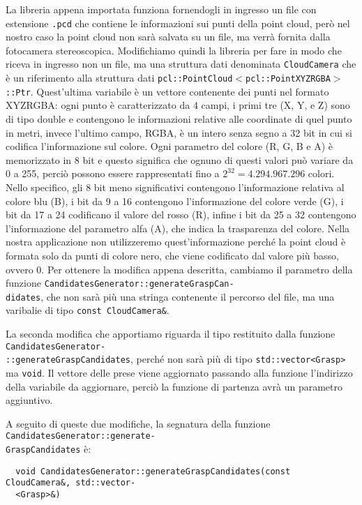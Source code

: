 \documentclass{report}
\begin{document}
La libreria appena importata funziona fornendogli in ingresso un file con estensione \texttt{.pcd} che contiene le informazioni sui punti della point cloud, però nel nostro caso la point cloud non sarà salvata su un file, ma verrà fornita dalla fotocamera stereoscopica. Modifichiamo quindi la libreria per fare in modo che riceva in ingresso non un file, ma una struttura dati denominata \texttt{CloudCamera} che è un riferimento alla struttura dati \texttt{pcl::PointCloud$<$pcl::PointXYZRGBA$>$::Ptr}. Quest'ultima variabile è un vettore contenente dei punti nel formato XYZRGBA: ogni punto è caratterizzato da 4 campi, i primi tre (X, Y, e Z) sono di tipo double e contengono le informazioni relative alle coordinate di quel punto in metri, invece l'ultimo campo, RGBA, è un intero senza segno a 32 bit in cui si codifica l'informazione sul colore. Ogni parametro del colore (R, G, B e A) è memorizzato in 8 bit e questo significa che ognuno di questi valori può variare da 0 a 255, perciò possono essere rappresentati fino a $\displaystyle{2^{32}=4.294.967.296}$ colori. Nello specifico, gli 8 bit meno significativi contengono l'informazione relativa al colore blu (B), i bit da 9 a 16 contengono l'informazione del colore verde (G), i bit da 17 a 24 codificano il valore del rosso (R), infine i bit da 25 a 32 contengono l'informazione del parametro alfa (A), che indica la trasparenza del colore. Nella nostra applicazione non utilizzeremo quest'informazione perché la point cloud è formata solo da punti di colore nero, che viene codificato dal valore più basso, ovvero 0. Per ottenere la modifica appena descritta, cambiamo il parametro della funzione \texttt{CandidatesGenerator::generateGraspCan-}\\\texttt{didates}, che non sarà più una stringa contenente il percorso del file, ma una varibalie di tipo \texttt{const CloudCamera\&}. \par
La seconda modifica che apportiamo riguarda il tipo restituito dalla funzione \texttt{CandidatesGenerator-}\\\texttt{::generateGraspCandidates}, perché non sarà più di tipo \texttt{std::vector<Grasp>} ma \texttt{void}. Il vettore delle prese viene aggiornato passando alla funzione l'indirizzo della variabile da aggiornare, perciò la funzione di partenza avrà un parametro aggiuntivo. \par 
A seguito di queste due modifiche, la segnatura della funzione \texttt{CandidatesGenerator::generate-}\\\texttt{GraspCandidates} è:
\begin{verbatim}
  void CandidatesGenerator::generateGraspCandidates(const CloudCamera&, std::vector-
  <Grasp>&)
\end{verbatim}
\end{document}
